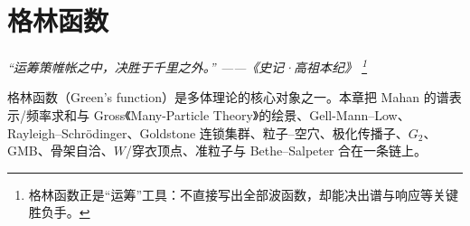 \chapter{格林函数}
\renewcommand{\currentchapterpath}{chapters/ch03/}

\begin{flushright}
\textit{“运筹策帷帐之中，决胜于千里之外。” ——《史记·高祖本纪》
\footnote{格林函数正是“运筹”工具：不直接写出全部波函数，却能决出谱与响应等关键胜负手。}}
\end{flushright}

格林函数（Green's function）是多体理论的核心对象之一。本章把 Mahan 的谱表示/频率求和与 Gross《Many-Particle Theory》的绘景、Gell-Mann--Low、Rayleigh--Schr\"odinger、Goldstone 连锁集群、粒子--空穴、极化传播子、$G_2$、GMB、骨架自洽、$W$/穿衣顶点、准粒子与 Bethe--Salpeter 合在一条链上。


